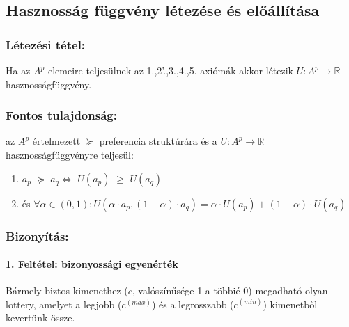 \documentclass[a4paper,12pt]{article}
\begin{document}

\subsection{Hasznosság függvény létezése és előállítása}

\subsubsection{Létezési tétel: } Ha az $A^p$ elemeire teljesülnek az 1.,2'.,3.,4.,5. axiómák akkor létezik  $U: A^p \rightarrow \mathbb{R}$ hasznosságfüggvény.

\subsubsection{Fontos tulajdonság: } az $A^p$ értelmezett $\succeq$ preferencia struktúrára és a $U: A^p \rightarrow \mathbb{R}$ hasznosságfüggvényre teljesül: 
\begin{enumerate}
\item $a_p$  $\succeq$ $a_q \Leftrightarrow $ $U(a_p)$  $\geq$ $U(a_q)$
\item és $\forall  \alpha \in (0,1): U(\alpha\cdot a_p , (1-\alpha)\cdot a_q ) = \alpha\cdot U(a_p) + (1-\alpha)\cdot U(a_q) $
\end{enumerate}

\subsubsection{Bizonyítás: }
 
\paragraph{1. Feltétel: bizonyossági egyenérték}
Bármely biztos kimenethez ($c$, valószínűsége 1 a többié 0) megadható olyan lottery, amelyet a legjobb ($c^{(max)}$) és a legrosszabb ($c^{(min)}$) kimenetből kevertünk össze. 
\end{document}
